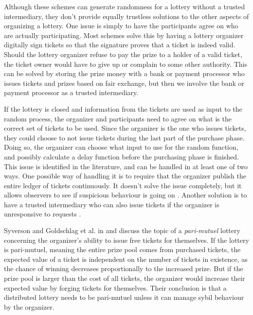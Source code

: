 Although these schemes can generate randomness for a lottery without a trusted intermediary, they don't provide equally trustless solutions to the other aspects of organizing a lottery. One issue is simply to have the participants agree on who are actually participating. Most schemes solve this by having a lottery organizer digitally sign tickets so that the signature proves that a ticket is indeed valid. Should the lottery organizer refuse to pay the prize to a holder of a valid ticket, the ticket owner would have to give up or complain to some other authority. This can be solved by storing the prize money with a bank or payment processor who issues tickets and prizes based on fair exchange, but then we involve the bank or payment processor as a trusted intermediary. 

If the lottery is closed and information from the tickets are used as input to the random process, the organizer and participants need to agree on what is the correct set of tickets to be used. Since the organizer is the one who issues tickets, they could choose to not issue tickets during the last part of the purchase phase. Doing so, the organizer can choose what input to use for the random function, and possibly calculate a delay function before the purchasing phase is finished. This issue is identified in the literature, and can be handled in at least one of two ways. One possible way of handling it is to require that the organizer publish the entire ledger of tickets continuously. It doesn't solve the issue completely, but it allows observers to see if suspicious behaviour is going on \cite{syverson_weakly_1998}. Another solution is to have a trusted intermediary who can also issue tickets if the organizer is unresponsive to requests \cite{zhou_playing_2001}.

Syverson and Goldschlag et al. in \cite{syverson_weakly_1998} and \cite{goldschlag_temporarily_2010} discuss the topic of a \emph{pari-mutuel} lottery concerning the organizer's ability to issue free tickets for themselves. If the lottery is pari-mutuel, meaning the entire prize pool comes from purchased tickets, the expected value of a ticket is independent on the number of tickets in existence, as the chance of winning decreases proportionally to the increased prize. But if the prize pool is larger than the cost of all tickets, the organizer would increase their expected value by forging tickets for themselves. Their conclusion is that a distributed lottery needs to be pari-mutuel unless it can manage sybil behaviour by the organizer.

